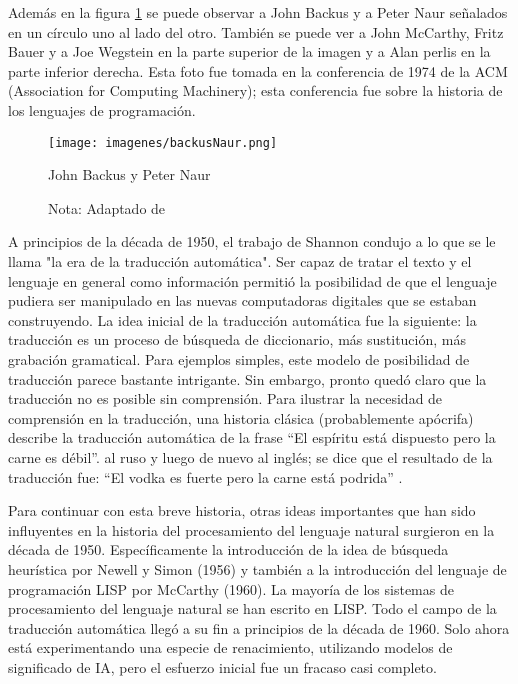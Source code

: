 \documentclass[12pt]{article}
\begin{document}
			Además en la figura \ref{fig:BackusNaur} se puede observar a John Backus y a Peter Naur señalados en un círculo uno al lado del otro. También se puede ver a John McCarthy, Fritz Bauer y a Joe Wegstein en la parte superior de la imagen y a Alan perlis en la parte inferior derecha. Esta foto fue tomada en la conferencia de 1974 de la ACM (Association for Computing Machinery); esta conferencia fue sobre la historia de los lenguajes de programación. 
		
			\begin{figure}[H]
				\texttt{[image: imagenes/backusNaur.png]}
				\centering
				\caption{John Backus y Peter Naur}
				\caption*{\small Nota: Adaptado de  \cite{UMBC2004}}
				\label{fig:BackusNaur}
			\end{figure}
			
					
			A principios de la década de 1950, el trabajo de Shannon condujo a lo que se le llama "la era de la traducción automática". Ser capaz de tratar el texto y el lenguaje en general como información permitió la posibilidad de que el lenguaje pudiera ser manipulado en las nuevas computadoras digitales que se estaban construyendo. La idea inicial de la traducción automática fue la siguiente: la traducción es un proceso de búsqueda de diccionario, más sustitución, más grabación gramatical. Para ejemplos simples, este modelo de posibilidad de traducción parece bastante intrigante. Sin embargo, pronto quedó claro que la traducción no es posible sin comprensión. Para ilustrar la necesidad de comprensión en la traducción, una historia clásica (probablemente apócrifa) describe la traducción automática de la frase ``El espíritu está dispuesto pero la carne es débil''. al ruso y luego de nuevo al inglés; se dice que el resultado de la traducción fue: ``El vodka es fuerte pero la carne está podrida'' .\cite{Lehnert2014}
			
			Para continuar con esta breve historia, otras ideas importantes que han sido influyentes en la historia del procesamiento del lenguaje natural surgieron en la década de 1950. Específicamente la introducción de la idea de búsqueda heurística por Newell y Simon (1956) y también a la introducción del lenguaje de programación LISP por McCarthy (1960). La mayoría de los sistemas de procesamiento del lenguaje natural se han escrito en LISP.
			Todo el campo de la traducción automática llegó a su fin a principios de la década de 1960. Solo ahora está experimentando una especie de renacimiento, utilizando modelos de significado de IA, pero el esfuerzo inicial fue un fracaso casi completo.\cite{Lehnert2014}
			
\end{document}
